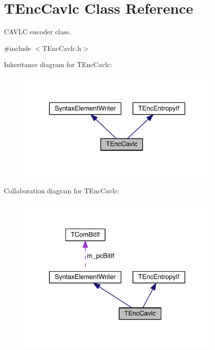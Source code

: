 \hypertarget{class_t_enc_cavlc}{}\section{T\+Enc\+Cavlc Class Reference}
\label{class_t_enc_cavlc}


C\+A\+V\+LC encoder class.  




{\ttfamily \#include $<$T\+Enc\+Cavlc.\+h$>$}



Inheritance diagram for T\+Enc\+Cavlc\+:
\nopagebreak
\begin{figure}[H]
\begin{center}
\leavevmode
\includegraphics[width=288pt]{d6/db3/class_t_enc_cavlc__inherit__graph}
\end{center}
\end{figure}


Collaboration diagram for T\+Enc\+Cavlc\+:
\nopagebreak
\begin{figure}[H]
\begin{center}
\leavevmode
\includegraphics[width=288pt]{d4/df0/class_t_enc_cavlc__coll__graph}
\end{center}
\end{figure}
